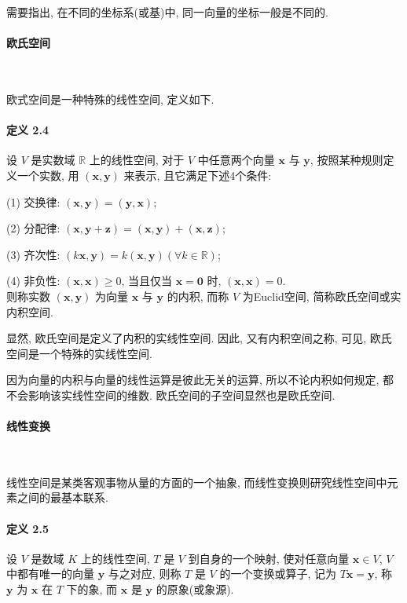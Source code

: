 \par 需要指出, 在不同的坐标系(或基)中, 同一向量的坐标一般是不同的.

\paragraph*{欧氏空间} \

\par 欧式空间是一种特殊的线性空间, 定义如下.

\paragraph*{定义 2.4} 设 $V$ 是实数域 $\mathbb{R}$ 上的线性空间, 对于 $V$ 中任意两个向量 $\bm{x}$ 与 $\bm{y}$, 按照某种规则定义一个实数, 用 $(\bm{x}, \bm{y})$ 来表示, 且它满足下述4个条件:
\par (1) 交换律: $(\bm{x}, \bm{y}) = (\bm{y}, \bm{x})$;
\par (2) 分配律: $(\bm{x}, \bm{y} + \bm{z}) = (\bm{x}, \bm{y}) + (\bm{x}, \bm{z})$;
\par (3) 齐次性: $(k\bm{x}, \bm{y}) = k(\bm{x}, \bm{y})(\forall k \in \mathbb{R})$;
\par (4) 非负性: $(\bm{x}, \bm{x}) \geqslant 0$, 当且仅当 $\bm{x} = \bm{0}$ 时, $(\bm{x}, \bm{x}) = 0$.
\\ 则称实数 $(\bm{x}, \bm{y})$ 为向量 $\bm{x}$ 与 $\bm{y}$ 的内积, 而称 $V$ 为Euclid空间, 简称欧氏空间或实内积空间.

\par 显然, 欧氏空间是定义了内积的实线性空间. 因此, 又有内积空间之称, 可见, 欧氏空间是一个特殊的实线性空间.

\par 因为向量的内积与向量的线性运算是彼此无关的运算, 所以不论内积如何规定, 都
不会影响该实线性空间的维数. 欧氏空间的子空间显然也是欧氏空间.

\paragraph[]{线性变换} \

\par 线性空间是某类客观事物从量的方面的一个抽象, 而线性变换则研究线性空间中元素之间的最基本联系.

\paragraph*{定义 2.5} 设 $V$ 是数域 $K$ 上的线性空间, $T$ 是 $V$ 到自身的一个映射, 使对任意向量
$\bm{x} \in V$, $V$ 中都有唯一的向量 $\bm{y}$ 与之对应, 则称 $T$ 是 $V$ 的一个变换或算子, 记为 $T\bm{x} = \bm{y}$,
称 $\bm{y}$ 为 $\bm{x}$ 在 $T$ 下的象, 而 $\bm{x}$ 是 $\bm{y}$ 的原象(或象源).

